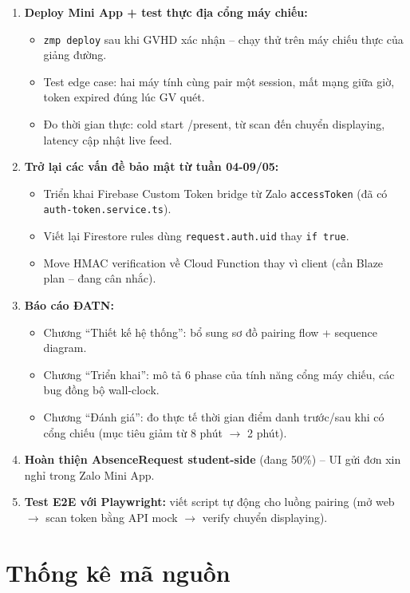 \documentclass{article}
\begin{document}
\begin{enumerate}[leftmargin=1.5em]
  \item \textbf{Deploy Mini App + test thực địa cổng máy chiếu:}
  \begin{itemize}[leftmargin=1em]
    \item \texttt{zmp deploy} sau khi GVHD xác nhận -- chạy thử trên máy chiếu thực của giảng đường.
    \item Test edge case: hai máy tính cùng pair một session, mất mạng giữa giờ, token expired đúng lúc GV quét.
    \item Đo thời gian thực: cold start /present, từ scan đến chuyển displaying, latency cập nhật live feed.
  \end{itemize}
  \item \textbf{Trở lại các vấn đề bảo mật từ tuần 04-09/05:}
  \begin{itemize}[leftmargin=1em]
    \item Triển khai Firebase Custom Token bridge từ Zalo \texttt{accessToken} (đã có \texttt{auth-token.service.ts}).
    \item Viết lại Firestore rules dùng \texttt{request.auth.uid} thay \texttt{if true}.
    \item Move HMAC verification về Cloud Function thay vì client (cần Blaze plan -- đang cân nhắc).
  \end{itemize}
  \item \textbf{Báo cáo ĐATN:}
  \begin{itemize}[leftmargin=1em]
    \item Chương ``Thiết kế hệ thống'': bổ sung sơ đồ pairing flow + sequence diagram.
    \item Chương ``Triển khai'': mô tả 6 phase của tính năng cổng máy chiếu, các bug đồng bộ wall-clock.
    \item Chương ``Đánh giá'': đo thực tế thời gian điểm danh trước/sau khi có cổng chiếu (mục tiêu giảm từ 8 phút $\to$ 2 phút).
  \end{itemize}
  \item \textbf{Hoàn thiện AbsenceRequest student-side} (đang 50\%) -- UI gửi đơn xin nghỉ trong Zalo Mini App.
  \item \textbf{Test E2E với Playwright:} viết script tự động cho luồng pairing (mở web $\to$ scan token bằng API mock $\to$ verify chuyển displaying).
\end{enumerate}

\section{Thống kê mã nguồn}
\end{document}

